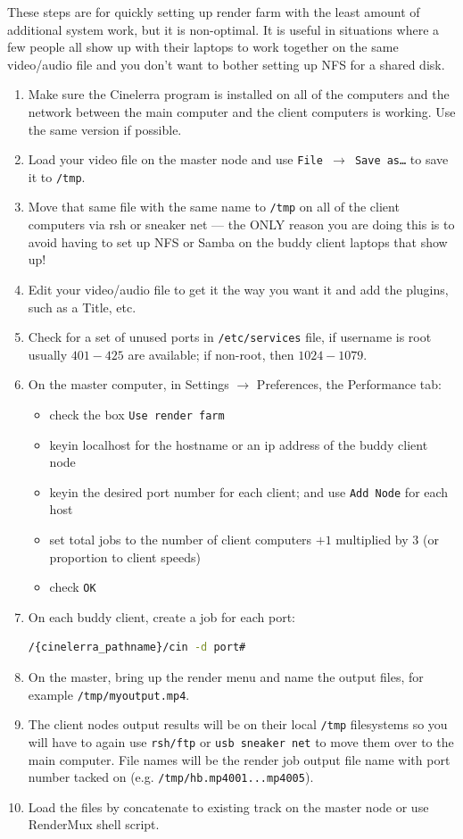These steps are for quickly setting up render farm with the least amount of additional system work, but it is non-optimal.  It is useful in situations where a few people all show up with their laptops to work together on the same video/audio file and you don’t want to bother setting up NFS for a shared disk.

\begin{enumerate}
    \item Make sure the Cinelerra program is installed on all of the computers and the network between the
    main computer and the client computers is working.  Use the same version if possible.
    \item Load your video file on the master node and use \texttt{File $\rightarrow$ Save as\dots}  to save it to \texttt{/tmp}.
    \item Move that same file with the same name to \texttt{/tmp} on all of the client computers via rsh or sneaker net --- the ONLY reason you are doing this is to avoid having to set up NFS or Samba on the buddy client
    laptops that show up!
    \item Edit your video/audio file to get it the way you want it and add the plugins, such as a Title, etc.
    \item Check for a set of unused ports in \texttt{/etc/services} file, if username is root usually $401-425$ are
    available; if non-root, then $1024-1079$.
    \item On the master computer, in Settings $\rightarrow$ Preferences, the Performance tab:
    \begin{itemize}
        \item check the box \texttt{Use render farm}
        \item keyin localhost for the hostname or an ip address of the buddy client node
        \item keyin the desired port number for each client; and use \texttt{Add Node} for each host
        \item set total jobs to the number of client computers $+1$ multiplied by $3$ (or proportion to client speeds)
        \item check \texttt{OK}
    \end{itemize}
    \item On each buddy client, create a job for each port:    
    \begin{lstlisting}[language=bash]
/{cinelerra_pathname}/cin -d port#
    \end{lstlisting}
    \item On the master, bring up the render menu and name the output files, for example \texttt{/tmp/myoutput.mp4}.
    \item The client nodes output results will be on their local \texttt{/tmp} filesystems so you will have to again use
    \texttt{rsh/ftp} or \texttt{usb sneaker net} to move them over to the main computer.  File names will be the render
    job output file name with port number tacked on (e.g. \texttt{/tmp/hb.mp4001...mp4005}).
    \item Load the files by concatenate to existing track on the master node or use RenderMux shell script.
\end{enumerate}

